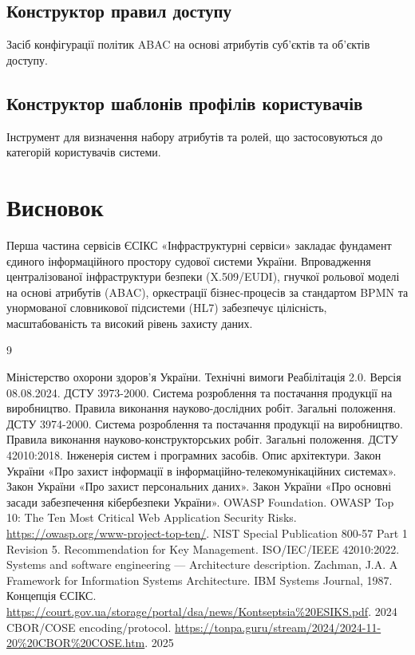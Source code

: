 \documentclass{article}
\begin{document}
\subsection{Конструктор правил доступу}
Засіб конфігурації політик ABAC на основі атрибутів суб'єктів та об'єктів доступу.

\subsection{Конструктор шаблонів профілів користувачів}
Інструмент для визначення набору атрибутів та ролей, що застосовуються до категорій користувачів системи.

\newpage
\section*{Висновок}

Перша частина сервісів ЄСІКС «Інфраструктурні сервіси» закладає фундамент єдиного інформаційного простору судової системи України.
Впровадження централізованої інфраструктури безпеки (X.509/EUDI), гнучкої рольової моделі на основі атрибутів (ABAC),
оркестрації бізнес-процесів за стандартом BPMN та унормованої словникової підсистеми (HL7) забезпечує цілісність,
масштабованість та високий рівень захисту даних.

\begin{thebibliography}{9}

 Міністерство охорони здоров’я України. \newblock Технічні вимоги Реабілітація 2.0. \newblock Версія 08.08.2024.
 ДСТУ 3973-2000. \newblock Система розроблення та постачання продукції на виробництво. Правила виконання науково-дослідних робіт. Загальні положення.
 ДСТУ 3974-2000. \newblock Система розроблення та постачання продукції на виробництво. Правила виконання науково-конструкторських робіт. Загальні положення.
 ДСТУ 42010:2018. \newblock Інженерія систем і програмних засобів. Опис архітектури.
 Закон України «Про захист інформації в інформаційно-телекомунікаційних системах».
 Закон України «Про захист персональних даних».
 Закон України «Про основні засади забезпечення кібербезпеки України».
 OWASP Foundation. \newblock OWASP Top 10: The Ten Most Critical Web Application Security Risks. \newblock \url{https://owasp.org/www-project-top-ten/}.
 NIST Special Publication 800-57 Part 1 Revision 5. \newblock Recommendation for Key Management.
 ISO/IEC/IEEE 42010:2022. \newblock Systems and software engineering — Architecture description.
 Zachman, J.A. \newblock A Framework for Information Systems Architecture. \newblock IBM Systems Journal, 1987.
 Концепція ЄСІКС. \url{https://court.gov.ua/storage/portal/dsa/news/Kontseptsia%20ESIKS.pdf}. 2024
 CBOR/COSE encoding/protocol. \url{https://tonpa.guru/stream/2024/2024-11-20%20CBOR%20COSE.htm}. 2025

\end{thebibliography}
\end{document}
